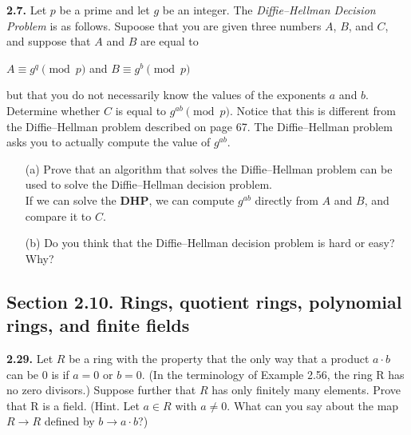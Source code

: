\documentclass[11pt,fleqn]{article}
\begin{document}
\textbf{2.7.} Let $p$ be a prime and let $g$ be an integer. The \textit{Diffie–Hellman Decision Problem} is as follows. Supoose that you are given three numbers $A$, $B$, and $C$, and suppose that $A$ and $B$ are equal to
\begin{center}
$A \equiv g^q \pmod{p}$  and  $B \equiv g^b \pmod{p}$
\end{center}
but that you do not necessarily know the values of the exponents $a$ and $b$. Determine whether $C$ is equal to $g^{ab} \pmod{p}$. Notice that this is different from the Diffie–Hellman problem described on page 67. The Diffie–Hellman problem asks you to actually compute the value of $g^{ab}$. 
\begin{itemize}
\item[(a)] Prove that an algorithm that solves the Diffie–Hellman problem can be used to solve the Diffie–Hellman decision problem. \\
  If we can solve the \textbf{DHP}, we can compute $g^{ab}$ directly from $A$ and $B$, and compare it to $C$.  
\item[(b)] Do you think that the Diffie–Hellman decision problem is hard or easy? Why? \\
  
\end{itemize}


\subsection*{Section 2.10. Rings, quotient rings, polynomial rings, and finite fields}

\textbf{2.29.} Let $R$ be a ring with the property that the only way that a product $a \cdot b$ can be $0$ is if $a = 0$ or $b = 0$. (In the terminology of Example 2.56, the ring R has no zero divisors.) Suppose further that $R$ has only finitely many elements. Prove that R is a field. (Hint. Let $a \in R$ with $a \neq 0$. What can you say about the map $R \rightarrow R$ defined by $b \rightarrow a \cdot b$?) 
\end{document}
